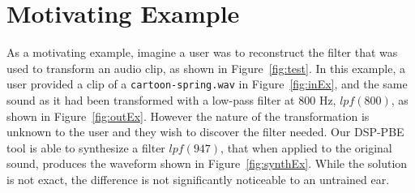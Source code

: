 \section{Motivating Example}

As a motivating example, imagine a user was to reconstruct the filter that was used to transform an audio clip, as shown in Figure~\ref{fig:test}.
In this example, a user provided a clip of a \texttt{cartoon-spring.wav} in Figure~\ref{fig:inEx}, and the same sound as it had been transformed with a low-pass filter at 800 Hz, $lpf(800)$, as shown in Figure~\ref{fig:outEx}.
However the nature of the transformation is unknown to the user and they wish to discover the filter needed.
Our DSP-PBE tool is able to synthesize a filter $lpf(947)$, that when applied to the original sound, produces the waveform shown in Figure~\ref{fig:synthEx}.
While the solution is not exact, the difference is not significantly noticeable to an untrained ear.

